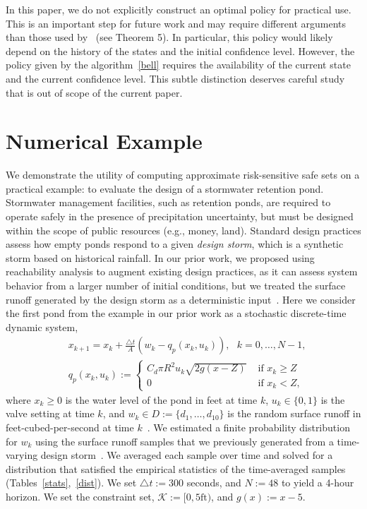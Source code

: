 \documentclass[letterpaper, 10 pt, conference]{ieeeconf}  %
\begin{document}
In this paper, we do not explicitly construct an optimal policy for practical use.
This is an important step for future work and may require different arguments 
than those used by~\cite{chow2015risk} (see Theorem 5). In particular, this policy would likely depend 
on the history of the states and the initial confidence level. However, the policy given by the algorithm~\eqref{bell}
requires the availability of the current state and the current confidence level. 
This subtle distinction deserves careful study that is out of scope of the current paper.

\section{Numerical Example}\label{ex}
We demonstrate the utility of computing approximate risk-sensitive safe sets on a practical example:
to evaluate the design of a stormwater retention pond. 
Stormwater management facilities, such as retention ponds, are required to operate safely 
in the presence of precipitation uncertainty, but must be designed within the scope of public resources (e.g., money, land). 
Standard design practices assess how empty ponds respond to a given \textit{design storm},
which is a synthetic storm based on historical rainfall.  
In our prior work, we proposed using reachability analysis to augment existing design practices, as it can assess 
system behavior from a larger number of initial conditions, but we treated the surface runoff generated by the design storm as a deterministic input~\cite{sustech}.
Here we consider the first pond from the example in our prior work as a stochastic discrete-time dynamic system,
\begin{equation}\begin{aligned}
& x_{k+1} = x_k + \frac{\triangle t}{A} (w_k - q_p(x_k, u_k)), \text{ }k = 0, \dots, N-1, \\
& q_p(x_k,u_k) := \begin{cases} C_d \pi R^2 u_k \sqrt{ 2g(x-Z) } & \text{ if } x_k \geq Z \\
						0 & \text{ if } x_k < Z, \end{cases}
\end{aligned}\label{watersys}\end{equation}
where $x_k \geq 0$ is the water level of the pond in feet at time $k$, $u_k \in \{0, 1\}$ is the valve setting at time $k$,
and $w_k \in D := \{d_1, \dots, d_{10}\}$ is the random surface runoff in feet-cubed-per-second at time $k$~\cite{sustech}.\footnotemark
{} 
We estimated a finite probability distribution for $w_k$ using the surface runoff samples that we previously generated from a time-varying design storm~\cite{sustech}. 
We averaged each sample over time and solved for a distribution
that satisfied the empirical statistics of the time-averaged samples (Tables~\ref{stats},~\ref{dist}). 
We set $\triangle t := 300$ seconds, and $N := 48$ to yield a 4-hour horizon.
We set the constraint set, $\mathcal{K} := [0, 5\text{ft})$, and $g(x) := x - 5$.
\end{document}
